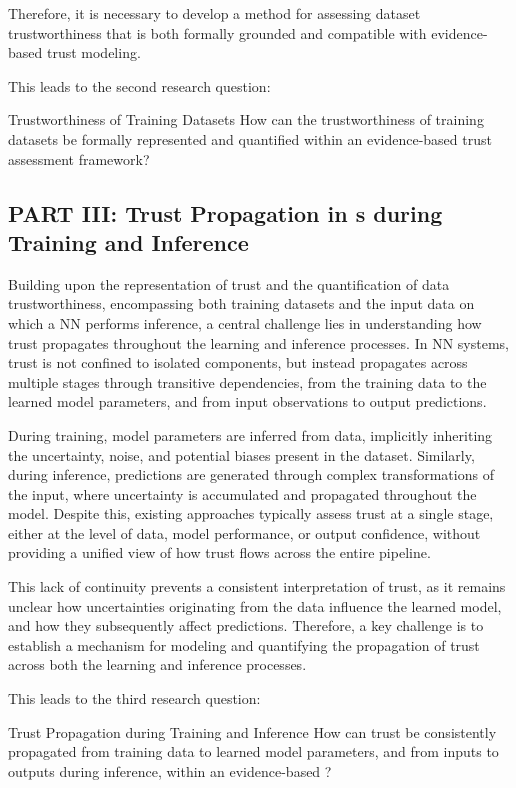 Therefore, it is necessary to develop a method for assessing dataset trustworthiness that is both formally grounded and compatible with evidence-based trust modeling.

This leads to the second research question:
\begin{rqbox}{Trustworthiness of Training Datasets}
    How can the trustworthiness of training datasets be formally represented and quantified within an evidence-based trust assessment framework?
\end{rqbox}

\subsection{PART III: Trust Propagation in s during Training and Inference}
Building upon the representation of trust and the quantification of data trustworthiness, encompassing both training datasets and the input data on which a \ac{NN} performs inference, a central challenge lies in understanding how trust propagates throughout the learning and inference processes. In \ac{NN} systems, trust is not confined to isolated components, but instead propagates across multiple stages through transitive dependencies, from the training data to the learned model parameters, and from input observations to output predictions.

During training, model parameters are inferred from data, implicitly inheriting the uncertainty, noise, and potential biases present in the dataset. Similarly, during inference, predictions are generated through complex transformations of the input, where uncertainty is accumulated and propagated throughout the model. Despite this, existing approaches typically assess trust at a single stage, either at the level of data, model performance, or output confidence, without providing a unified view of how trust flows across the entire pipeline.

This lack of continuity prevents a consistent interpretation of trust, as it remains unclear how uncertainties originating from the data influence the learned model, and how they subsequently affect predictions. Therefore, a key challenge is to establish a mechanism for modeling and quantifying the propagation of trust across both the learning and inference processes.

This leads to the third research question:
\begin{rqbox}{Trust Propagation during Training and Inference}
    How can trust be consistently propagated from training data to learned model parameters, and from inputs to outputs during inference, within an evidence-based ?
\end{rqbox}

